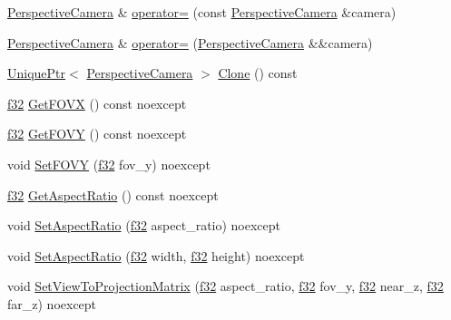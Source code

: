 \begin{DoxyCompactItemize}
\item 
\hyperlink{classmage_1_1_perspective_camera}{Perspective\+Camera} \& \hyperlink{classmage_1_1_perspective_camera_a0fe5ef8bd4d28efa8e4851a8055b6fa5}{operator=} (const \hyperlink{classmage_1_1_perspective_camera}{Perspective\+Camera} \&camera)
\item 
\hyperlink{classmage_1_1_perspective_camera}{Perspective\+Camera} \& \hyperlink{classmage_1_1_perspective_camera_a338c75900237f3623b31b0231a5f5782}{operator=} (\hyperlink{classmage_1_1_perspective_camera}{Perspective\+Camera} \&\&camera)
\item 
\hyperlink{namespacemage_a3316d7143a973e37adf1110f2e80ca31}{Unique\+Ptr}$<$ \hyperlink{classmage_1_1_perspective_camera}{Perspective\+Camera} $>$ \hyperlink{classmage_1_1_perspective_camera_a21545965da7ef1b6f99887bb6d2bb095}{Clone} () const
\item 
\hyperlink{namespacemage_a6a44ad388483959dc4dff9f2aef91431}{f32} \hyperlink{classmage_1_1_perspective_camera_aee867dfe72f18fe15a720b147ecf0cf8}{Get\+F\+O\+VX} () const noexcept
\item 
\hyperlink{namespacemage_a6a44ad388483959dc4dff9f2aef91431}{f32} \hyperlink{classmage_1_1_perspective_camera_aa1e80ee1b46ba8dcf50eb2fb0f6ddc16}{Get\+F\+O\+VY} () const noexcept
\item 
void \hyperlink{classmage_1_1_perspective_camera_ada7a3eb5a8ad903ebf2d5bb92cdf8881}{Set\+F\+O\+VY} (\hyperlink{namespacemage_a6a44ad388483959dc4dff9f2aef91431}{f32} fov\+\_\+y) noexcept
\item 
\hyperlink{namespacemage_a6a44ad388483959dc4dff9f2aef91431}{f32} \hyperlink{classmage_1_1_perspective_camera_aab74a3a01418a27e1c0a3b3ab118681e}{Get\+Aspect\+Ratio} () const noexcept
\item 
void \hyperlink{classmage_1_1_perspective_camera_a5dafb5a3583c500f37d6c9fbae912511}{Set\+Aspect\+Ratio} (\hyperlink{namespacemage_a6a44ad388483959dc4dff9f2aef91431}{f32} aspect\+\_\+ratio) noexcept
\item 
void \hyperlink{classmage_1_1_perspective_camera_a3066d8e949d3bbd5999ec16553a34f01}{Set\+Aspect\+Ratio} (\hyperlink{namespacemage_a6a44ad388483959dc4dff9f2aef91431}{f32} width, \hyperlink{namespacemage_a6a44ad388483959dc4dff9f2aef91431}{f32} height) noexcept
\item 
void \hyperlink{classmage_1_1_perspective_camera_ab32c40a7ffa8ba3bdb2d63cb5a239777}{Set\+View\+To\+Projection\+Matrix} (\hyperlink{namespacemage_a6a44ad388483959dc4dff9f2aef91431}{f32} aspect\+\_\+ratio, \hyperlink{namespacemage_a6a44ad388483959dc4dff9f2aef91431}{f32} fov\+\_\+y, \hyperlink{namespacemage_a6a44ad388483959dc4dff9f2aef91431}{f32} near\+\_\+z, \hyperlink{namespacemage_a6a44ad388483959dc4dff9f2aef91431}{f32} far\+\_\+z) noexcept

\end{DoxyCompactItemize}
